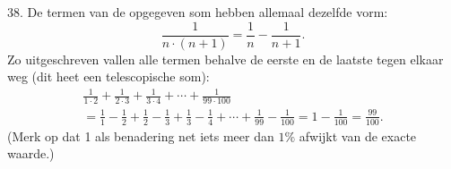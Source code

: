 \begin{problem}{38.}
    De termen van de opgegeven som hebben allemaal dezelfde vorm:
    \begin{equation*}
        \frac{1}{n \cdot (n + 1)} = \frac{1}{n} - \frac{1}{n + 1}.
    \end{equation*}
    Zo uitgeschreven vallen alle termen behalve de eerste en de laatste tegen elkaar weg (dit heet een telescopische som):
    \begin{multline*}
		\frac{1}{1 \cdot 2} + \frac{1}{2 \cdot 3} + \frac{1}{3 \cdot 4} + \dotsb + \frac{1}{99 \cdot 100} \\
        = \frac{1}{1} - \frac{1}{2} + \frac{1}{2} - \frac{1}{3} + \frac{1}{3} - \frac{1}{4} + \dotsb + \frac{1}{99} - \frac{1}{100} = 1 - \frac{1}{100} = \frac{99}{100}.
    \end{multline*}
    (Merk op dat 1 als benadering net iets meer dan $1\%$ afwijkt van de exacte waarde.)
\end{problem}


